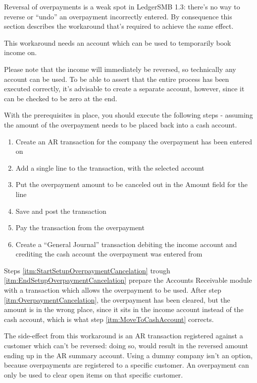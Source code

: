 Reversal of overpayments is a weak spot in LedgerSMB 1.3: there's no way
to reverse or ``undo'' an overpayment incorrectly entered.  By consequence
this section describes the workaround that's required to achieve the same
effect.

This workaround needs an account which can be used to temporarily book income on.

Please note that the income will immediately be reversed, so
technically any account can be used.  To be able to assert that the entire process
has been executed correctly, it's advisable to create a separate account, however, since
it can be checked to be zero at the end.

With the prerequisites in place, you should execute the following steps - assuming the amount
of the overpayment needs to be placed back into a cash account.

\begin{enumerate}
\item \label{itm:StartSetupOverpaymentCancelation} Create an AR transaction for the
    company the overpayment has been entered on
\item Add a single line to the transaction, with the selected account
\item Put the overpayment amount to be canceled out in the Amount field for the line
\item \label{itm:EndSetupOverpaymentCancelation} Save and post the transaction
\item \label{itm:OverpaymentCancelation} Pay the transaction from the overpayment
\item \label{itm:MoveToCashAccount} Create a ``General Journal'' transaction debiting the income account and crediting the
    cash account the overpayment was entered from
\end{enumerate}

Steps \ref{itm:StartSetupOverpaymentCancelation} trough \ref{itm:EndSetupOverpaymentCancelation}
prepare the Accounts Receivable module with a transaction which allows the overpayment to be used.
After step \ref{itm:OverpaymentCancelation}, the overpayment has been cleared, but the
amount is in the wrong place, since it sits in the income account instead of the cash account,
which is what step \ref{itm:MoveToCashAccount} corrects.

The side-effect from this workaround is an AR transaction registered against a \gls{customer} which can't
be reversed: doing so, would result in the reversed amount ending up in the AR summary account.  Using
a dummy company isn't an option, because overpayments are registered to a specific \gls{customer}.  An
overpayment can only be used to clear open items on that specific \gls{customer}.

